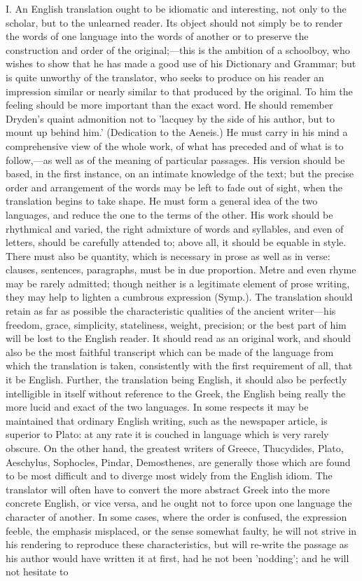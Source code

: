 \documentclass[11pt,letter]{article}
\begin{document}
\par  I. An English translation ought to be idiomatic and interesting, not only to the scholar, but to the unlearned reader. Its object should not simply be to render the words of one language into the words of another or to preserve the construction and order of the original;—this is the ambition of a schoolboy, who wishes to show that he has made a good use of his Dictionary and Grammar; but is quite unworthy of the translator, who seeks to produce on his reader an impression similar or nearly similar to that produced by the original. To him the feeling should be more important than the exact word. He should remember Dryden's quaint admonition not to 'lacquey by the side of his author, but to mount up behind him.' (Dedication to the Aeneis.) He must carry in his mind a comprehensive view of the whole work, of what has preceded and of what is to follow,—as well as of the meaning of particular passages. His version should be based, in the first instance, on an intimate knowledge of the text; but the precise order and arrangement of the words may be left to fade out of sight, when the translation begins to take shape. He must form a general idea of the two languages, and reduce the one to the terms of the other. His work should be rhythmical and varied, the right admixture of words and syllables, and even of letters, should be carefully attended to; above all, it should be equable in style. There must also be quantity, which is necessary in prose as well as in verse: clauses, sentences, paragraphs, must be in due proportion. Metre and even rhyme may be rarely admitted; though neither is a legitimate element of prose writing, they may help to lighten a cumbrous expression (Symp.). The translation should retain as far as possible the characteristic qualities of the ancient writer—his freedom, grace, simplicity, stateliness, weight, precision; or the best part of him will be lost to the English reader. It should read as an original work, and should also be the most faithful transcript which can be made of the language from which the translation is taken, consistently with the first requirement of all, that it be English. Further, the translation being English, it should also be perfectly intelligible in itself without reference to the Greek, the English being really the more lucid and exact of the two languages. In some respects it may be maintained that ordinary English writing, such as the newspaper article, is superior to Plato: at any rate it is couched in language which is very rarely obscure. On the other hand, the greatest writers of Greece, Thucydides, Plato, Aeschylus, Sophocles, Pindar, Demosthenes, are generally those which are found to be most difficult and to diverge most widely from the English idiom. The translator will often have to convert the more abstract Greek into the more concrete English, or vice versa, and he ought not to force upon one language the character of another. In some cases, where the order is confused, the expression feeble, the emphasis misplaced, or the sense somewhat faulty, he will not strive in his rendering to reproduce these characteristics, but will re-write the passage as his author would have written it at first, had he not been 'nodding'; and he will not hesitate to 
\end{document}
